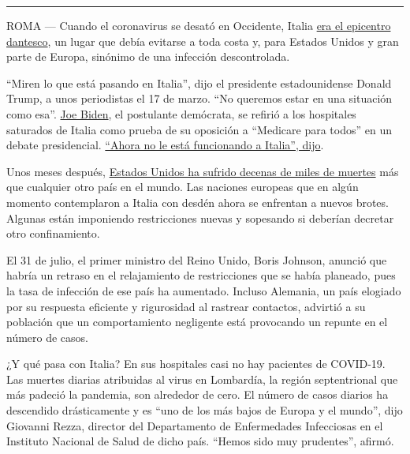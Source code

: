 \begin{center}\rule{0.5\linewidth}{\linethickness}\end{center}

ROMA --- Cuando el coronavirus se desató en Occidente, Italia
\href{https://www.nytimes.com/interactive/2020/03/27/world/europe/coronavirus-italy-bergamo.html}{era
el epicentro dantesco}, un lugar que debía evitarse a toda costa y, para
Estados Unidos y gran parte de Europa, sinónimo de una infección
descontrolada.

``Miren lo que está pasando en Italia'', dijo el presidente
estadounidense Donald Trump, a unos periodistas el 17 de marzo. ``No
queremos estar en una situación como esa''.
\href{https://www.nytimes.com/es/interactive/2020/espanol/estados-unidos/joe-biden-elecciones.html}{Joe
Biden}, el postulante demócrata, se refirió a los hospitales saturados
de Italia como prueba de su oposición a ``Medicare para todos'' en un
debate presidencial.
\href{https://edition.cnn.com/politics/live-news/2020-democratic-debate-live-updates/h_501d1e381370480bd021916a86029534}{``Ahora
no le está funcionando a Italia'', dijo}.

Unos meses después,
\href{https://www.nytimes.com/es/interactive/2020/espanol/mundo/coronavirus-en-estados-unidos.html}{Estados
Unidos ha sufrido decenas de miles de muertes} más que cualquier otro
país en el mundo. Las naciones europeas que en algún momento
contemplaron a Italia con desdén ahora se enfrentan a nuevos brotes.
Algunas están imponiendo restricciones nuevas y sopesando si deberían
decretar otro confinamiento.

El 31 de julio, el primer ministro del Reino Unido, Boris Johnson,
anunció que habría un retraso en el relajamiento de restricciones que se
había planeado, pues la tasa de infección de ese país ha aumentado.
Incluso Alemania, un país elogiado por su respuesta eficiente y
rigurosidad al rastrear contactos, advirtió a su población que un
comportamiento negligente está provocando un repunte en el número de
casos.

¿Y qué pasa con Italia? En sus hospitales casi no hay pacientes de
COVID-19. Las muertes diarias atribuidas al virus en Lombardía, la
región septentrional que más padeció la pandemia, son alrededor de cero.
El número de casos diarios ha descendido drásticamente y es ``uno de los
más bajos de Europa y el mundo'', dijo Giovanni Rezza, director del
Departamento de Enfermedades Infecciosas en el Instituto Nacional de
Salud de dicho país. ``Hemos sido muy prudentes'', afirmó.


